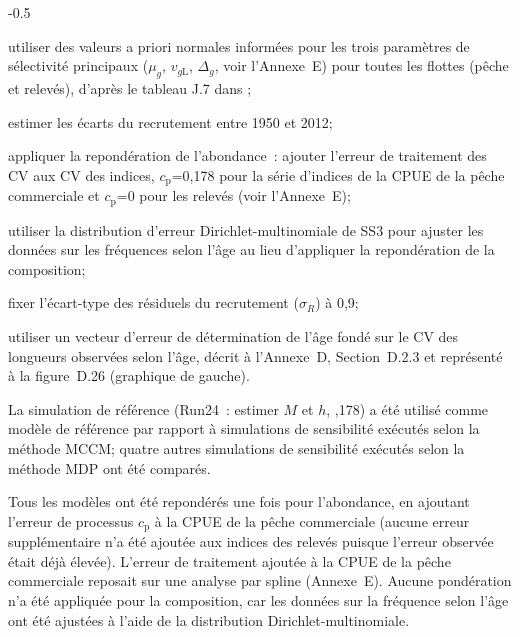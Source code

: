 \documentclass[11pt]{book}
\newcommand{\AppBio}{Annexe~D}
\newcommand{\AppEqn}{Annexe~E}
\begin{document}
\begin{itemize_csas}{-0.5}{}
  \item utiliser des valeurs a priori normales inform\'{e}es pour les trois param\`{e}tres de s\'{e}lectivit\'{e} principaux ($\mu_g$, $v_{g\text{L}}$, $\Delta_{g}$, voir l'\AppEqn) pour toutes les flottes (p\^{e}che et relev\'{e}s), d'apr\`{e}s le tableau J.7 dans \citet{Stanley-etal:2009_car};
  \item estimer les \'{e}carts du recrutement entre 1950 et 2012;
  \item appliquer la repond\'{e}ration de l'abondance~: ajouter l'erreur de traitement des CV aux CV des indices, $c_\text{p}$=0,178 pour la s\'{e}rie d'indices de la CPUE de la p\^{e}che commerciale et $c_\text{p}$=0 pour les relev\'{e}s (voir l'\AppEqn);
  \item utiliser la distribution d'erreur Dirichlet-multinomiale de SS3 pour ajuster les donn\'{e}es sur les fr\'{e}quences selon l'\^{a}ge au lieu d'appliquer la repond\'{e}ration de la composition;
  \item fixer l'\'{e}cart-type des r\'{e}siduels du recrutement ($\sigma_R$) \`{a} 0,9;
  \item utiliser un vecteur d'erreur de d\'{e}termination de l'\^{a}ge fond\'{e} sur le CV des longueurs observ\'{e}es selon l'\^{a}ge, d\'{e}crit \`{a} l'\AppBio, Section~D.2.3 et repr\'{e}sent\'{e} \`{a} la figure~D.26 (graphique de gauche).
\end{itemize_csas}
La simulation de r\'{e}f\'{e}rence (Run24~: estimer $M$ et $h$, ,178) a \'{e}t\'{e} utilis\'{e} comme mod\`{e}le de r\'{e}f\'{e}rence par rapport \`{a}  simulations de sensibilit\'{e} ex\'{e}cut\'{e}s selon la m\'{e}thode MCCM; quatre autres simulations de sensibilit\'{e} ex\'{e}cut\'{e}s selon la m\'{e}thode MDP ont \'{e}t\'{e} compar\'{e}s.

Tous les mod\`{e}les ont \'{e}t\'{e} repond\'{e}r\'{e}s une fois pour l'abondance, en ajoutant l'erreur de processus $c_\text{p}$ \`{a} la CPUE de la p\^{e}che commerciale (aucune erreur suppl\'{e}mentaire n'a \'{e}t\'{e} ajout\'{e}e aux indices des relev\'{e}s puisque l'erreur observ\'{e}e \'{e}tait d\'{e}j\`{a} \'{e}lev\'{e}e). L'erreur de traitement ajout\'{e}e \`{a} la CPUE de la p\^{e}che commerciale reposait sur une analyse par spline (\AppEqn).
Aucune pond\'{e}ration n'a \'{e}t\'{e} appliqu\'{e}e pour la composition, car les donn\'{e}es sur la fr\'{e}quence selon l'\^{a}ge ont \'{e}t\'{e} ajust\'{e}es \`{a} l'aide de la distribution Dirichlet-multinomiale.

\end{document}
